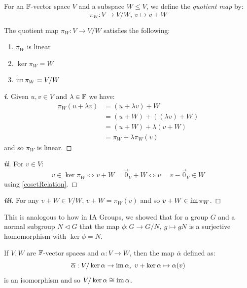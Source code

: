 \documentclass[../main.tex]{subfiles}
\begin{document}
\begin{definition}
  For an $\mathbb{F}$-vector space $V$ and a subspace $W \leq V$, we define the \textit{quotient map} by:
  \[
    \pi_{W}: V \to V / W,\ v \mapsto v + W
  \]
\end{definition}
\begin{proposition}
  The quotient map $\pi_{W}: V \to V / W$ satisfies the following: \label{quotMapProp}
  \begin{enumerate}
    \item $\pi_{W}$ is linear
    \item $\ker \pi_{W} = W$
    \item $\operatorname{im} \pi_{W} = V / W$
  \end{enumerate}
\end{proposition}
\begin{proof}[\textbf{i}]
  Given $u, v \in V$ and $\lambda \in \mathbb{F}$ we have:
  \begin{align*}
    \pi_{W}(u + \lambda v) &= (u + \lambda v) + W \\
                           &= (u + W) + ((\lambda v) + W) \\
                           &= (u + W) + \lambda (v + W) \\
                           &= \pi_{W} + \lambda \pi_{W}(v)
  \end{align*}
  and so $\pi_{W}$ is linear.
\end{proof}
\begin{proof}[\textbf{ii}]
  For $v \in V$:
  \[
    v \in \ker \pi_{W} \iff v + W = \vec{0}_{V} + W \iff v = v - \vec{0}_{V} \in W
  \]
  using \cref{cosetRelation}.
\end{proof}
\begin{proof}[\textbf{iii}]
  For any $v + W \in V / W$, $v + W = \pi_{W}(v)$ and so $v + W \in \operatorname{im} \pi_{W}$.
\end{proof}
\begin{remark}
  This is analogous to how in IA Groups, we showed that for a group $G$ and a normal subgroup $N \lhd G$ that the map $\phi: G \to G / N,\ g \mapsto g N$ is a surjective homomorphism with $\ker \phi = N$.
\end{remark}
\begin{theorem}
  If $V, W$ are $\mathbb{F}$-vector spaces and $\alpha: V \to W$, then the map $\overline{\alpha}$ defined as:
  \[
    \overline{\alpha}: V / \ker \alpha \to \operatorname{im} \alpha,\ v + \ker \alpha \mapsto \alpha(v)
  \]
  is an isomorphism and so $V / \ker \alpha \cong \operatorname{im} \alpha$.
\end{theorem}
\end{document}
